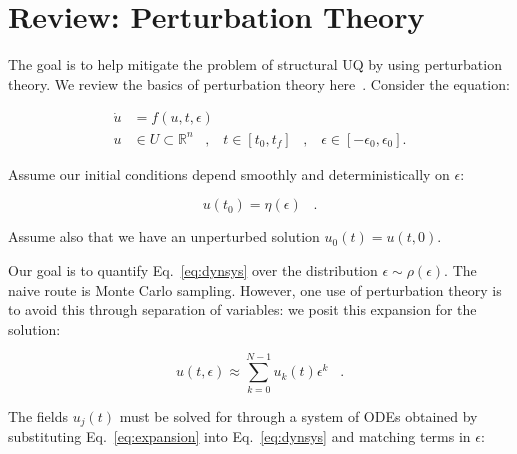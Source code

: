 \documentclass[11pt]{article}
\begin{document}
\newcommand*{\vertbar}{\rule[-1ex]{0.5pt}{2.5ex}}
\newcommand*{\horzbar}{\rule[.5ex]{2.5ex}{0.5pt}}
\maketitle

\vspace*{-0.75in}

\section{Review: Perturbation Theory}

The goal is to help mitigate the problem of structural UQ by using perturbation theory. 
We review the basics of perturbation theory here~\cite{khalil}.
Consider the equation:

\begin{equation}
        \label{eq:dynsys}
        \begin{aligned}
                \dot{u} &= f( u , t , \epsilon )  \\
                u &\in U \subset \mathbb{R}^n \;\;\; , \;\;\; t \in [t_0,t_f] \;\;\; , \;\;\; \epsilon \in [-\epsilon_0 , \epsilon_0].
        \end{aligned}
\end{equation}

\noindent Assume our initial conditions depend smoothly and deterministically on $\epsilon$:

\begin{equation}
        \label{eq:ics}
        u(t_0) = \eta(\epsilon) \;\;\; .
\end{equation}

\noindent Assume also that we have an unperturbed solution $u_0(t) = u(t,0)$.

\noindent Our goal is to quantify Eq.~\ref{eq:dynsys} over the distribution $\epsilon \sim \rho(\epsilon)$. 
The naive route is Monte Carlo sampling. 
However, one use of perturbation theory is to avoid this through separation of variables: we posit this expansion for the solution:

\begin{equation}
        \label{eq:expansion}
        u( t , \epsilon ) \approx \sum_{k=0}^{N-1} u_k(t) \epsilon^k \;\;\; .
\end{equation}

\noindent The fields $u_j(t)$ must be solved for through a system of ODEs obtained by substituting Eq.~\ref{eq:expansion} into Eq.~\ref{eq:dynsys} and matching terms in $\epsilon$:
\end{document}
